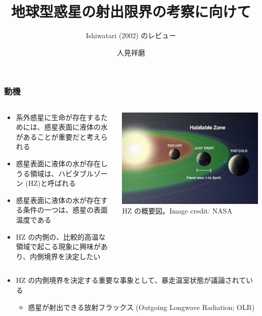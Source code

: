 \documentclass[aspectratio=149,9pt,]{beamer}
\institute{北海道大学大学院理学院 地球流体力学研究室 M2}
\author{人見祥磨}
\title{地球型惑星の射出限界の考察に向けて}
\subtitle{Ishiwatari \etal (2002) のレビュー}
\begin{document}
\maketitle

\begin{frame}
	\frametitle{動機}
	\begin{columns}[T,onlytextwidth]
		\begin{column}{.6\textwidth}
			\begin{itemize}
				\item 系外惑星に生命が存在するためには、惑星表面に液体の水があることが重要だと考えられる
				\item 惑星表面に液体の水が存在しうる領域は、ハビタブルゾーン (HZ)と呼ばれる
				\item 惑星表面に液体の水が存在する条件の一つは、惑星の表面温度である
				\item HZ の内側の、比較的高温な領域で起こる現象に興味があり、内側境界を決定したい
			\end{itemize}
		\end{column}
		\begin{column}{.35\textwidth}
			\centering
			\includegraphics[width=\textwidth]{hz.jpg}\\
			\scriptsize HZ の概要図。Image credit: NASA
		\end{column}
	\end{columns}
	\begin{itemize}
		\item HZ の内側境界を決定する重要な事象として、暴走温室状態が議論されている
			\begin{itemize}
				\item 惑星が射出できる放射フラックス (Outgoing Longwave Radiation; OLR)

\end{itemize}
\end{itemize}
\end{frame}
\end{document}

